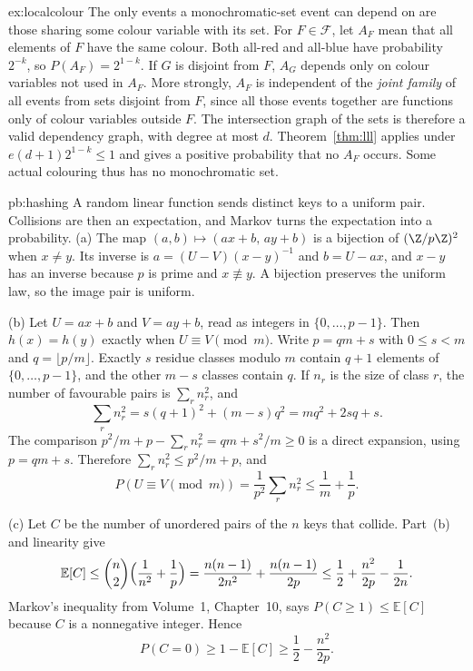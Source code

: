 \begin{solution}{ex:localcolour}
\idea The only events a monochromatic-set event can depend on are those sharing some colour variable with its set.
\writeup For $F\in\mathcal F$, let $A_F$ mean that all elements of $F$ have the same colour. Both all-red and all-blue have probability $2^{-k}$, so $P(A_F)=2^{1-k}$. If $G$ is disjoint from $F$, $A_G$ depends only on colour variables not used in $A_F$. More strongly, $A_F$ is independent of the \emph{joint family} of all events from sets disjoint from $F$, since all those events together are functions only of colour variables outside $F$. The intersection graph of the sets is therefore a valid dependency graph, with degree at most $d$. Theorem~\ref{thm:lll} applies under $e(d+1)2^{1-k}\le1$ and gives a positive probability that no $A_F$ occurs. Some actual colouring thus has no monochromatic set.
\end{solution}


\begin{solution}{pb:hashing}
\idea A random linear function sends distinct keys to a uniform pair. Collisions are then an expectation, and Markov turns the expectation into a probability.
\writeup (a) The map $(a,b)\mapsto(ax+b,\,ay+b)$ is a bijection of $(\Z/p\Z)^2$ when $x\ne y$. Its inverse is $a=(U-V)(x-y)^{-1}$ and $b=U-ax$, and $x-y$ has an inverse because $p$ is prime and $x\not\equiv y$. A bijection preserves the uniform law, so the image pair is uniform.

(b) Let $U=ax+b$ and $V=ay+b$, read as integers in $\{0,\ldots,p-1\}$. Then $h(x)=h(y)$ exactly when $U\equiv V\pmod m$. Write $p=qm+s$ with $0\le s<m$ and $q=\lfloor p/m\rfloor$. Exactly $s$ residue classes modulo $m$ contain $q+1$ elements of $\{0,\ldots,p-1\}$, and the other $m-s$ classes contain $q$. If $n_r$ is the size of class $r$, the number of favourable pairs is $\sum_r n_r^2$, and
\[
 \sum_r n_r^2=s(q+1)^2+(m-s)q^2=mq^2+2sq+s.
\]
The comparison $p^2/m+p-\sum_r n_r^2=qm+s^2/m\ge0$ is a direct expansion, using $p=qm+s$. Therefore $\sum_r n_r^2\le p^2/m+p$, and
\[
 P(U\equiv V\pmod m)=\frac1{p^2}\sum_r n_r^2\le\frac1m+\frac1p.
\]

(c) Let $C$ be the number of unordered pairs of the $n$ keys that collide. Part~(b) and linearity give
\[
 \mathbb E[C]\le\binom n2\Bigl(\frac1{n^2}+\frac1p\Bigr)
 =\frac{n(n-1)}{2n^2}+\frac{n(n-1)}{2p}
 \le\frac12+\frac{n^2}{2p}-\frac1{2n}.
\]
Markov's inequality from Volume~1, Chapter~10, says $P(C\ge1)\le\mathbb E[C]$ because $C$ is a nonnegative integer. Hence
\[
 P(C=0)\ge1-\mathbb E[C]\ge\frac12-\frac{n^2}{2p}.
\]
\end{solution}

